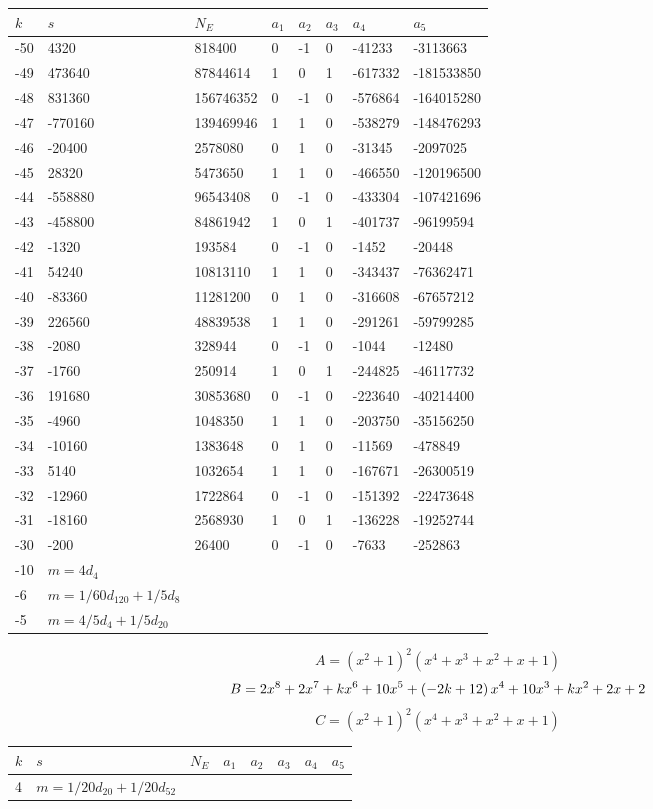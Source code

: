 \documentclass{amsart}
\begin{document}
\begin{longtable}{|l|l|l|lllll|}
\hline
$k$ & $s$ & $N_E$ & $a_1$ & $a_2$ & $a_3$ & $a_4$ & $a_5$\\
\hline
-50&4320&818400&0&-1&0&-41233&-3113663\\
-49&473640&87844614&1&0&1&-617332&-181533850\\
-48&831360&156746352&0&-1&0&-576864&-164015280\\
-47&-770160&139469946&1&1&0&-538279&-148476293\\
-46&-20400&2578080&0&1&0&-31345&-2097025\\
-45&28320&5473650&1&1&0&-466550&-120196500\\
-44&-558880&96543408&0&-1&0&-433304&-107421696\\
-43&-458800&84861942&1&0&1&-401737&-96199594\\
-42&-1320&193584&0&-1&0&-1452&-20448\\
-41&54240&10813110&1&1&0&-343437&-76362471\\
-40&-83360&11281200&0&1&0&-316608&-67657212\\
-39&226560&48839538&1&1&0&-291261&-59799285\\
-38&-2080&328944&0&-1&0&-1044&-12480\\
-37&-1760&250914&1&0&1&-244825&-46117732\\
-36&191680&30853680&0&-1&0&-223640&-40214400\\
-35&-4960&1048350&1&1&0&-203750&-35156250\\
-34&-10160&1383648&0&1&0&-11569&-478849\\
-33&5140&1032654&1&1&0&-167671&-26300519\\
-32&-12960&1722864&0&-1&0&-151392&-22473648\\
-31&-18160&2568930&1&0&1&-136228&-19252744\\
-30&-200&26400&0&-1&0&-7633&-252863\\
-10&$m=4d_{4}$&&\multicolumn{5}{c|}{}\\
-6&$m=1/60d_{120}+1/5d_{8}$&&\multicolumn{5}{c|}{}\\
-5&$m=4/5d_{4}+1/5d_{20}$&&\multicolumn{5}{c|}{}\\
\hline
\end{longtable}
$$A=(x^2
 + 1)^{2}(x^4
 + x^3
 + x^2
 + x
 + 1)$$
$$B=2\*x^8
 + 2\*x^7
 + k\*x^6
 + 10\*x^5
 + \left(-2\*k
 + 12\right) \*x^4
 + 10\*x^3
 + k\*x^2
 + 2\*x
 + 2$$
$$C=(x^2
 + 1)^{2}(x^4
 + x^3
 + x^2
 + x
 + 1)$$
\begin{longtable}{|l|l|l|lllll|}
\hline
$k$ & $s$ & $N_E$ & $a_1$ & $a_2$ & $a_3$ & $a_4$ & $a_5$\\
\hline
4&$m=1/20d_{20}+1/20d_{52}$&&\multicolumn{5}{c|}{}\\
\hline
\end{longtable}
\end{document}
